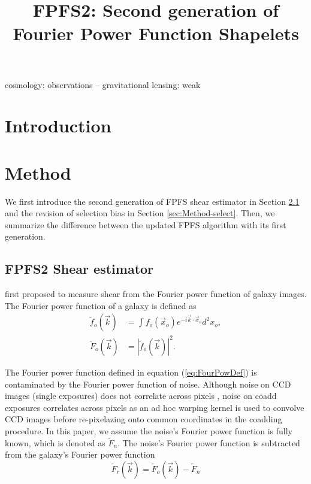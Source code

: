 \documentclass[a4paper,fleqn,usenatbib]{mnras}
\title{FPFS2: Second generation of Fourier Power Function Shapelets}
\author[]{}
\begin{document}
\label{firstpage}
\pagerange{\pageref{firstpage}--\pageref{lastpage}}
\maketitle

\begin{abstract}
\end{abstract}


\begin{keywords}
cosmology: observations -- gravitational lensing: weak
\end{keywords}

\section{Introduction}
\label{sec:Intro}


\section{Method}
\label{sec:Method}

We first introduce the second generation of FPFS shear estimator in Section
\ref{sec:Method-shapelets} and the revision of selection bias in Section
\ref{sec:Method-select}. Then, we summarize the difference between the updated
FPFS algorithm with its first generation.

\subsection{FPFS2 Shear estimator}
\label{sec:Method-shapelets}

\citet{Z08} first proposed to measure shear from the Fourier power function of
galaxy images. The Fourier power function of a galaxy is defined as
\begin{equation} \label{eq:FourPowDef}
\begin{split}
\tilde{f}_o(\vec{k})&=\int f_o(\vec{x}_o) e^{-i\vec{k} \cdot \vec{x}_o} d^2x_o,\\
\tilde{F}_o(\vec{k})&=|\tilde{f}_o(\vec{k})|^2.
\end{split}
\end{equation}


The Fourier power function defined in equation (\ref{eq:FourPowDef}) is
contaminated by the Fourier power function of noise. Although noise on CCD
images (single exposures) does not correlate across pixels \citep{Z15}, noise
on coadd exposures correlates across pixels as an ad hoc warping kernel is used
to convolve CCD images before re-pixelazing onto common coordinates in the
coadding procedure. In this paper, we assume the noise's Fourier power function
is fully known, which is denoted as $\tilde{F}_n$. The noise's Fourier power function is subtracted from the galaxy's Fourier power function
\begin{equation}
\tilde{F}_r(\vec{k})=\tilde{F}_o(\vec{k})-\tilde{F}_n
\end{equation}
\end{document}
